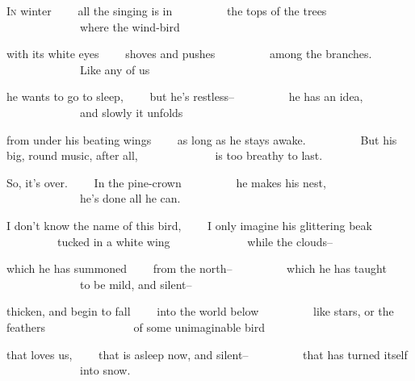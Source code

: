 
\begin{poem}
\begin{stanza}
\textsc{In} winter\verseline
~~~~all the singing is in\verseline
~~~~~~~~~the tops of the trees\verseline
~~~~~~~~~~~~~where the wind-bird
\end{stanza}

\begin{stanza}
with its white eyes\verseline
~~~~shoves and pushes\verseline
~~~~~~~~~among the branches.\verseline
~~~~~~~~~~~~~Like any of us
\end{stanza}

\begin{stanza}
he wants to go to sleep,\verseline
~~~~but he's restless--\verseline
~~~~~~~~~he has an idea,\verseline
~~~~~~~~~~~~~and slowly it unfolds
\end{stanza}

\begin{stanza}
from under his beating wings\verseline
~~~~as long as he stays awake.\verseline
~~~~~~~~~But his big, round music, after all,\verseline
~~~~~~~~~~~~~is too breathy to last.
\end{stanza}

\begin{stanza}
So, it's over.\verseline
~~~~In the pine-crown\verseline
~~~~~~~~~he makes his nest,\verseline
~~~~~~~~~~~~~he's done all he can.
\end{stanza}

\begin{stanza}
I don't know the name of this bird,\verseline
~~~~I only imagine his glittering beak\verseline
~~~~~~~~~tucked in a white wing\verseline
~~~~~~~~~~~~~while the clouds--
\end{stanza}

\begin{stanza}
which he has summoned\verseline
~~~~from the north--\verseline
~~~~~~~~~which he has taught\verseline
~~~~~~~~~~~~~to be mild, and silent--
\end{stanza}

\begin{stanza}
thicken, and begin to fall\verseline
~~~~into the world below\verseline
~~~~~~~~~like stars, or the feathers\verseline
~~~~~~~~~~~~~~~of some unimaginable bird
\end{stanza}

\begin{stanza}
that loves us,\verseline
~~~~that is asleep now, and silent--\verseline
~~~~~~~~~that has turned itself\verseline
~~~~~~~~~~~~~into snow.
\end{stanza}
\end{poem}


